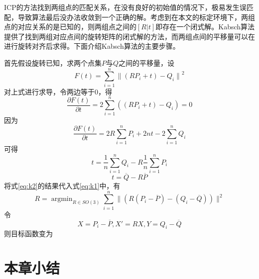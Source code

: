 ICP的方法找到两组点的匹配关系，在没有良好的初始值的情况下，极易发生误匹配，导致算法最后没办法收敛到一个正确的解。考虑到在本文的标定环境下，两组点的对应关系的是已知的，则两组点之间的$[R|t]$即存在一个闭式解。Kabsch算法提供了找到两组对应点间的旋转矩阵的闭式解的方法，而两组点间的平移量可以在进行旋转对齐后求得。下面介绍Kabsch算法的主要步骤。

首先假设旋转已知，求两个点集$P$与$Q$之间的平移量，设
\begin{equation}
    F(t) = \sum_{i=1}^n{\|(RP_i + t)-Q_i \|}^2
    \label{eq:k1}
\end{equation}
对上式进行求导，令两边等于0，得
\begin{equation}
    \frac{\partial F(t)}{\partial t}=2\sum_{i=1}^n{((RP_i + t)-Q_i)}=0
\end{equation}
因为
\begin{equation}
    \frac{\partial F(t)}{\partial t}=2R\sum_{i=1}^n{P_i} +2nt - 2\sum_{i=1}^n{Q_i}
\end{equation}
可得
\begin{equation}
    t = \frac{1}{n}\sum_{i=1}^n{Q_i}-R\frac{1}{n}\sum_{i=1}^n{P_i}
\end{equation}
\begin{equation}
    t = \overline{Q}-R\overline{P}
    \label{eq:k2}
\end{equation}
将式\ref{eq:k2}的结果代入式\ref{eq:k1}中，有
\begin{equation}
    R = \mathop{\arg\min}_{R \in SO(3)} \sum_{i=1}^n\|(R(P_i - \overline{P})-(Q_i - \overline{Q}))\|^2
\end{equation}
令
$$
    X = P_i - \overline{P}, X' = RX, Y= Q_i - \overline{Q}
$$
则目标函数变为
\section{本章小结}

